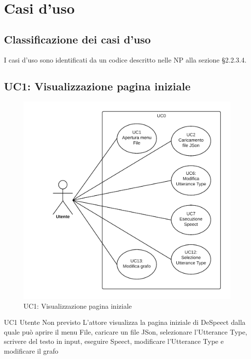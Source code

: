 \documentclass[../AnalisideiRequisiti.tex]{subfiles}
\begin{document}

	\chapter{Casi d'uso}
	\section{Classificazione dei casi d'uso}
	I casi d'uso sono identificati da un codice descritto nelle NP alla sezione §2.2.3.4. 
	
 	
	\section{UC1: Visualizzazione pagina iniziale}
	\begin{figure}[H]
 
		\centering
 
		\includegraphics[width=\textwidth]{../img/UC1.png}
 
		\caption{UC1: Visualizzazione pagina iniziale}
 
	\end{figure}
	\UserCase
	{UC1}
	{Utente}
	{Non previsto}
	{L'attore visualizza la pagina iniziale di DeSpeect dalla quale può aprire il menu File, caricare un file JSon, selezionare l'Utterance Type, scrivere del testo in input, eseguire Speect, modificare l'Utterance Type e modificare il grafo}
\end{document}
